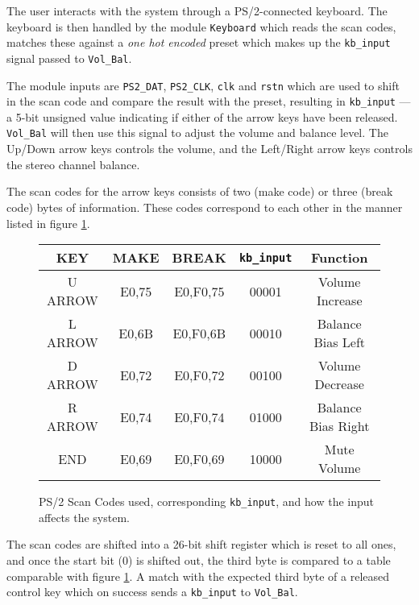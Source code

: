 The user interacts with the system through a PS/2-connected keyboard. The keyboard is then handled by the module \verb?Keyboard? which reads the scan codes, matches these against a \emph{one hot encoded} preset which makes up the \verb?kb_input? signal passed to \verb?Vol_Bal?.

The module inputs are \verb=PS2_DAT=, \verb=PS2_CLK=, \verb=clk= and \verb=rstn= which are used to shift in the scan code and compare the result with the preset, resulting in \verb=kb_input= --- a 5-bit unsigned value indicating if either of the arrow keys have been released. \verb=Vol_Bal= will then use this signal to adjust the volume and balance level. The Up/Down arrow keys controls the volume, and the Left/Right arrow keys controls the stereo channel balance.

The scan codes for the arrow keys consists of two (make code) or three (break code) bytes of information. These codes correspond to each other in the manner listed in figure \ref{fig:scancodes}. 

\begin{figure}[h]
\centering
\caption{PS/2 Scan Codes used, corresponding \texttt{kb\_input}, and how the input affects the system.}
\begin{tabular}{|c|c|c|c|c|}
\hline
KEY & MAKE & BREAK & \verb+kb_input+ & Function\\ \hline
U ARROW & E0,75 & E0,F0,75 & 00001 & Volume Increase\\ \hline
L ARROW & E0,6B & E0,F0,6B & 00010 & Balance Bias Left\\ \hline
D ARROW & E0,72 & E0,F0,72 & 00100 & Volume Decrease\\ \hline
R ARROW & E0,74 & E0,F0,74 & 01000 & Balance Bias Right\\ \hline
END		& E0,69 & E0,F0,69 & 10000 & Mute Volume\\ \hline
\end{tabular}
\label{fig:scancodes}
\end{figure}

The scan codes are shifted into a 26-bit shift register which is reset to all ones, and once the start bit (0) is shifted out, the third byte is compared to a table comparable with figure \ref{fig:scancodes}. A match with the expected third byte of a released control key which on success sends a \verb+kb_input+ to \verb+Vol_Bal+.
